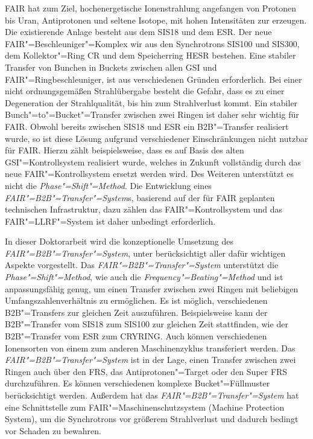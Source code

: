 FAIR hat zum Ziel, hochenergetische Ionenstrahlung angefangen von Protonen bis Uran, Antiprotonen und seltene Isotope, mit hohen Intensit\"aten zur erzeugen. Die existierende Anlage besteht aus dem SIS18 und dem ESR. Der neue FAIR"=Beschleuniger"=Komplex wir aus den Synchrotrons SIS100 und SIS300, dem Kollektor"=Ring CR und dem Speicherring HESR bestehen. Eine stabiler Transfer von Bunchen in Buckets zwischen allen GSI und FAIR"=Ringbeschleuniger, ist aus verschiedenen Gr\"unden erforderlich. Bei einer nicht ordnungsgem\"a\ss{}en Strahl\"ubergabe besteht die Gefahr, dass es zu einer Degeneration der Strahlqualit\"at, bis hin zum Strahlverlust kommt. Ein stabiler Bunch"=to"=Bucket"=Transfer zwischen zwei Ringen ist daher sehr wichtig f\"ur FAIR. Obwohl bereits zwischen SIS18 und ESR ein B2B"=Transfer realisiert wurde, so ist diese L\"osung aufgrund verschiedener Einschr\"ankungen nicht nutzbar f\"ur FAIR. Hierzu z\"ahlt beispielsweise, dass es auf Basis des alten GSI"=Kontrollsystem realisiert wurde, welches in Zukunft vollst\"andig durch das neue FAIR"=Kontrollsystem ersetzt werden wird. Des Weiteren unterst\"utzt es nicht die \textit{Phase"=Shift"=Method}. Die Entwicklung eines \textit{FAIR"=B2B"=Transfer"=System}s, basierend auf der f\"ur FAIR geplanten technischen Infrastruktur, dazu z\"ahlen das FAIR"=Kontrollsystem und das FAIR"=LLRF"=System ist daher unbedingt erforderlich.

In dieser Doktorarbeit wird die konzeptionelle Umsetzung des \textit{FAIR"=B2B"=Transfer"=System}, unter ber\"ucksichtigt aller daf\"ur wichtigen Aspekte vorgestellt. Das \textit{FAIR"=B2B"=Transfer"=System} unterst\"utzt die \textit{\textit{Phase"=Shift"=Method}}, wie auch die \textit{\textit{Frequency"=Beating"=Method}} und ist anpassungsf\"ahig genug, um einen Transfer zwischen zwei Ringen mit beliebigen Umfangszahlenverh\"altnis zu erm\"oglichen. Es ist m\"oglich, verschiedenen B2B"=Transfers zur gleichen Zeit auszuf\"uhren. Beispielsweise kann der B2B"=Transfer vom SIS18 zum SIS100 zur gleichen Zeit stattfinden, wie der B2B"=Transfer vom ESR zum CRYRING. Auch k\"onnen verschiedenen Ionensorten von einem zum anderen Maschinenzyklus transferiert werden. Das \textit{FAIR"=B2B"=Transfer"=System} ist in der Lage, einen Transfer zwischen zwei Ringen auch \"uber den FRS, das Antiprotonen"=Target oder den Super FRS durchzuf\"uhren. Es k\"onnen verschiedenen komplexe Bucket"=F\"ullmuster ber\"ucksichtigt werden. Au\ss{}erdem hat das \textit{FAIR"=B2B"=Transfer"=System} hat eine Schnittstelle zum FAIR"=Maschinenschutzsystem (Machine Protection System), um die Synchrotrons vor gr\"o\ss{}erem Strahlverlust und dadurch bedingt vor Schaden zu bewahren. 


